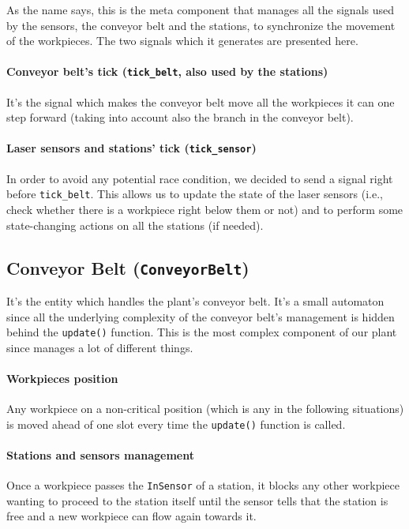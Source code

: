\documentclass[a4paper,twoside]{article}
\begin{document}
    As the name says, this is the meta component that manages all the signals used by the sensors, the conveyor belt and the stations, to synchronize the movement of the workpieces. The two signals which it generates are presented here.

    \paragraph{Conveyor belt's tick (\texttt{tick\_belt}, also used by the stations)} It's the signal which makes the conveyor belt move all the workpieces it can one step forward (taking into account also the branch in the conveyor belt).

    \paragraph{Laser sensors and stations' tick (\texttt{tick\_sensor})} In order to avoid any potential race condition, we decided to send a signal right before \texttt{tick\_belt}. This allows us to update the state of the laser sensors (i.e., check whether there is a workpiece right below them or not) and to perform some state-changing actions on all the stations (if needed).

    \subsection{Conveyor Belt (\texttt{ConveyorBelt})}

    It's the entity which handles the plant's conveyor belt. It's a small automaton since all the underlying complexity of the conveyor belt's management is hidden behind the \texttt{update()} function. This is the most complex component of our plant since manages a lot of different things.

    \paragraph{Workpieces position} Any workpiece on a non-critical position (which is any in the following situations) is moved ahead of one slot every time the \texttt{update()} function is called.

    \paragraph{Stations and sensors management} Once a workpiece passes the \texttt{InSensor} of a station, it blocks any other workpiece wanting to proceed to the station itself until the sensor tells that the station is free and a new workpiece can flow again towards it.
\end{document}
